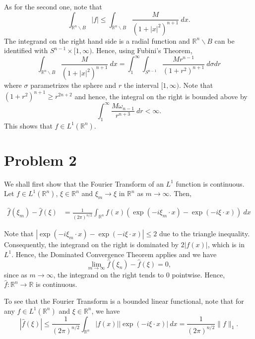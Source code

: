 \documentclass[12pt]{amsart}
\newcommand{\R}{\mathbb{R}}
\newcommand{\wh}[1]{\widehat{#1}}
\begin{document}
\begin{enumerate}[label=(\alph*)]
    As for the second one, note that 
    \begin{equation*}
        \int_{\R^n\backslash B} |f|\le\int_{\R^n\backslash B}\frac{M}{(1 + |x|^2)^{n + 1}}~dx.
    \end{equation*}
    The integrand on the right hand side is a radial function and $\R^n\backslash B$ can be identified with $S^{n - 1}\times[1,\infty)$. Hence, using Fubini's Theorem, 
    \begin{equation*}
        \int_{\R^n\backslash B}\frac{M}{(1 + |x|^2)^{n + 1}}~dx = \int_{1}^\infty\int_{S^{n - 1}}\frac{Mr^{n - 1}}{(1 + r^2)^{n + 1}}~d\sigma dr
    \end{equation*}
    where $\sigma$ parametrizes the sphere and $r$ the interval $[1,\infty)$. Note that $(1 + r^2)^{n + 1}\ge r^{2n + 2}$ and hence, the integral on the right is bounded above by
    \begin{equation*}
        \int_{1}^\infty\frac{M\omega_{n - 1}}{r^{n + 3}}~dr < \infty.
    \end{equation*}
    This shows that $f\in L^1(\R^n)$.
\end{enumerate}

\section*{Problem 2}

We shall first show that the Fourier Transform of an $L^1$ function is continuous. Let $f\in L^1(\R^n)$, $\xi\in\R^n$ and $\xi_m\to\xi$ in $\R^n$ as $m\to\infty$. Then, 

\begin{align*}
    \wh f(\xi_m) - \wh f(\xi) &= \frac{1}{(2\pi)^{n/2}}\int_{\R^n}f(x)\left(\exp(-i\xi_m\cdot x) - \exp(-i\xi\cdot x)\right)~dx
\end{align*}

Note that $|\exp(-i\xi_m\cdot x) - \exp(-i\xi\cdot x)|\le 2$ due to the triangle inequality. Consequently, the integrand on the right is dominated by $2|f(x)|$, which is in $L^1$. Hence, the Dominated Convergence Theorem applies and we have 
\begin{equation*}
    \lim_{m\to\infty}\wh f(\xi_n) - \wh f(\xi) = 0,
\end{equation*}
since as $m\to\infty$, the integrand on the right tends to $0$ pointwise. Hence, $\wh f: \R^n\to\R$ is continuous.

To see that the Fourier Transform is a bounded linear functional, note that for any $f\in L^1(\R^n)$ and $\xi\in\R^n$, we have 
\begin{equation*}
    \left|\wh f(\xi)\right|\le\frac{1}{(2\pi)^{n/2}}\int_{\R^n}|f(x)||\exp(-i\xi\cdot x)|~dx = \frac{1}{(2\pi)^{n/2}}\|f\|_1.
\end{equation*}
\end{document}
